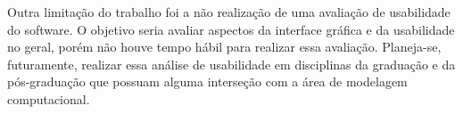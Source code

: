 \documentclass[
	12pt,				%
	openright,			%
	oneside,			%
	a4paper,			%
	main=brazil,
	english,			%
	]{ufsj-abntex2}
\begin{document}
Outra limitação do trabalho foi a não realização de uma avaliação de usabilidade do software. O objetivo seria avaliar aspectos da interface gráfica e da usabilidade no geral, porém não houve tempo hábil para realizar essa avaliação. Planeja-se, futuramente, realizar essa análise de usabilidade em disciplinas da graduação e da pós-graduação que possuam alguma interseção com a área de modelagem computacional. 



\postextual







\end{document}
